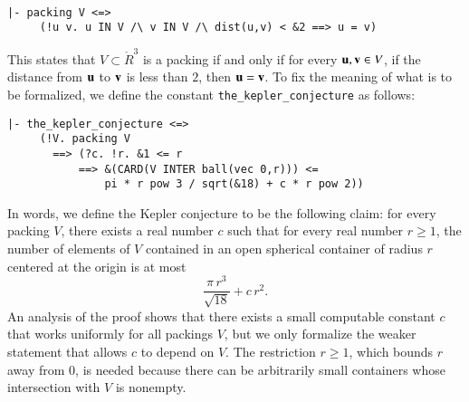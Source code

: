 \begin{obeylines}

\begin{verbatim}

|- packing V <=> 
     (!u v. u IN V /\ v IN V /\ dist(u,v) < &2 ==> u = v)

\end{verbatim}
\end{obeylines}
This states that $V\subset \ring{R}^3$ is a packing if and
only if for every ${\mathbf u}, {\mathbf v} \in V$, if the distance from ${\mathbf u}$ to ${\mathbf v}$ is
less than $2$, then ${\mathbf u}={\mathbf v}$.  To fix the meaning of what is to be
formalized, we define the constant {\tt the\_kepler\_conjecture} as
follows:
\begin{obeylines}

\begin{verbatim}
|- the_kepler_conjecture <=>
     (!V. packing V
       ==> (?c. !r. &1 <= r
           ==> &(CARD(V INTER ball(vec 0,r))) <=
               pi * r pow 3 / sqrt(&18) + c * r pow 2))
\end{verbatim}
\end{obeylines}
\noindent
In words, we define the Kepler conjecture to be the following claim:
for every packing $V$, there exists a real number $c$ such that for
every real number $r\ge 1$, the number of elements of $V$ contained in an
open spherical container of radius $r$ centered at the origin is at
most
\[
  \frac{\pi\, r^3}{\sqrt{18}} + c\, r^2.
\]
An analysis of the proof shows that there exists a
small computable constant $c$ that works uniformly for all packings
$V$, but we only formalize the weaker statement that allows $c$ to
depend on $V$.  The restriction $r\ge 1$, which bounds $r$ away from
$0$, is needed because there can be arbitrarily small containers whose
intersection with $V$ is nonempty.

